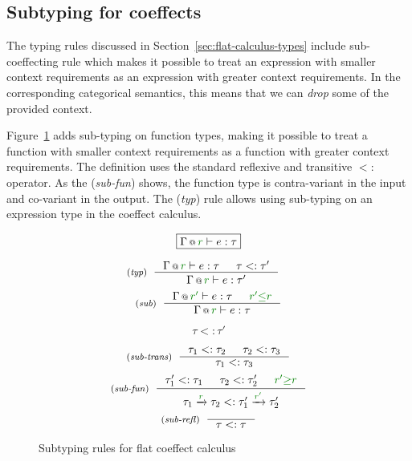 
\subsection{Subtyping for coeffects}

The typing rules discussed in Section~\ref{sec:flat-calculus-types} include sub-coeffecting rule
which makes it possible to treat an expression with smaller context requirements as an expression
with greater context requirements. In the corresponding categorical semantics, this means that
we can \emph{drop} some of the provided context.

Figure~\ref{fig:flat-types-sub} adds sub-typing on function types, making it possible to treat
a function with smaller context requirements as a function with greater context requirements. 
The definition uses the standard reflexive and transitive $<:$ operator. As the (\emph{sub-fun})
shows, the function type is contra-variant in the input and co-variant in the output. The 
(\emph{typ}) rule allows using sub-typing on an expression type in the coeffect calculus.


\begin{figure}[t]

\begin{equation*}
\boxed{\coctx{\Gamma}{\cclrd{r}} \vdash e : \tau}
\end{equation*}

\begin{equation*}
\tyrule{typ}
  { \coctx{\Gamma}{\cclrd{r}} \vdash e : \tau & \tau <: \tau' }
  { \coctx{\Gamma}{\cclrd{r}} \vdash e : \tau' }
\quad
\end{equation*}
\begin{equation*}
\tyrule{sub}
  {\coctx{\Gamma}{\cclrd{r'}} \vdash e : \tau & \cclrd{r'} \cleq \cclrd{r} }
  {\coctx{\Gamma}{\cclrd{r}} \vdash e : \tau }
\end{equation*}

\begin{equation*}
\boxed{\tau <: \tau'}
\end{equation*}

\begin{equation*}
\tyrule{sub-trans}
  { \tau_1 <: \tau_2 & \tau_2 <: \tau_3 }
  { \tau_1 <: \tau_3  }
\end{equation*}
\begin{equation*}
\tyrule{sub-fun}
  { \tau_1' <: \tau_1 & \tau_2 <: \tau_2' & \cclrd{r'} \cgeq \cclrd{r} }
  { \tau_1 \xrightarrow{\cclrd{r}} \tau_2 <: \tau_1' \xrightarrow{\cclrd{r'}} \tau_2' }
\end{equation*}
\begin{equation*}
\tyrule{sub-refl}
  { }
  { \tau <: \tau }
\end{equation*}

\caption{Subtyping rules for flat coeffect calculus}
\label{fig:flat-types-sub}
\end{figure}

